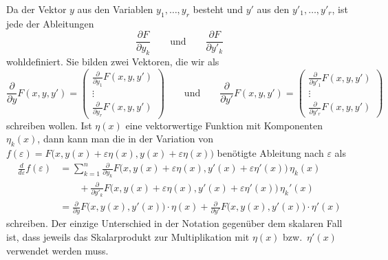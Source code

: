 Da der Vektor $y$ aus den Variablen $y_1,\dots,y_r$ besteht und $y'$
aus den $y'_1,\dots,y'_r$, ist jede der Ableitungen
\[
\frac{\partial F}{\partial y_k}
\qquad\text{und}\qquad
\frac{\partial F}{\partial y'_k}
\]
wohldefiniert.
Sie bilden zwei Vektoren, die wir als
\begin{equation}
\frac{\partial}{\partial y}
F(x,y,y')
=
\begin{pmatrix}
\displaystyle
\frac{\partial}{\partial y_1}F(x,y,y')\\
\vdots\\
\displaystyle
\frac{\partial}{\partial y_r}F(x,y,y')
\end{pmatrix}
\qquad\text{und}\qquad
\frac{\partial}{\partial y'} F(x,y,y')
=
\begin{pmatrix}
\displaystyle
\frac{\partial}{\partial y'_1}F(x,y,y')\\
\vdots\\
\displaystyle
\frac{\partial}{\partial y'_r}F(x,y,y')
\end{pmatrix}
\end{equation}
schreiben wollen.
Ist $\eta(x)$ eine vektorwertige Funktion mit Komponenten
$\eta_k(x)$, dann kann man die in der Variation von
$f(\varepsilon)
=
F\bigl(x,y(x)+\varepsilon\eta(x),y(x)+\varepsilon\eta(x)\bigr)$
benötigte Ableitung nach $\varepsilon$ als
\begin{align*}
\frac{d}{d\varepsilon}f(\varepsilon)
&=
\sum_{k=1}^n
\frac{\partial}{\partial y_k}
F\bigl(x,y(x)+\varepsilon\eta(x),y'(x)+\varepsilon\eta'(x)\bigr)
\,
\eta_k(x)
\\
&\qquad
+
\frac{\partial}{\partial y'_k}
F\bigl(x,y(x)+\varepsilon\eta(x),y'(x)+\varepsilon\eta'(x)\bigr)
\,
\eta_k'(x)
\\
&=
\frac{\partial}{\partial y}
F\bigl(x,y(x),y'(x)\bigr)\cdot \eta(x)
+
\frac{\partial}{\partial y'}
F\bigl(x,y(x),y'(x)\bigr)\cdot \eta'(x)
\end{align*}
schreiben.
Der einzige Unterschied in der Notation gegenüber dem skalaren Fall
ist, dass jeweils das Skalarprodukt zur Multiplikation mit $\eta(x)$
bzw.~$\eta'(x)$ verwendet werden muss.

%
%
